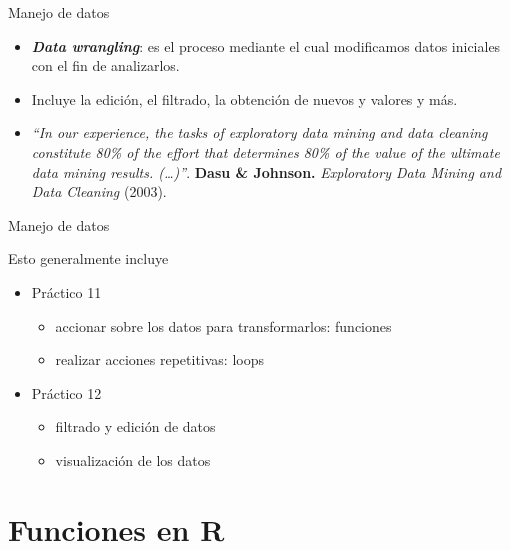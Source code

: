 \documentclass[ignorenonframetext,]{beamer}
\providecommand{\tightlist}{%
  \setlength{\itemsep}{0pt}\setlength{\parskip}{0pt}}
\begin{document}
\begin{frame}{Manejo de datos}
\protect\hypertarget{manejo-de-datos-2}{}

\begin{itemize}
\tightlist
\item
  \textbf{\emph{Data wrangling}}: es el proceso mediante el cual
  modificamos datos iniciales con el fin de analizarlos.
\item
  Incluye la edición, el filtrado, la obtención de nuevos y valores y
  más.
\item
  \emph{``In our experience, the tasks of exploratory data mining and
  data cleaning constitute 80\% of the effort that determines 80\% of
  the value of the ultimate data mining results. (\ldots{})''}.
  \textbf{Dasu \& Johnson.} \emph{Exploratory Data Mining and Data
  Cleaning} (2003).
\end{itemize}

\end{frame}

\begin{frame}{Manejo de datos}
\protect\hypertarget{manejo-de-datos-3}{}

Esto generalmente incluye

\begin{itemize}
\tightlist
\item
  Práctico 11

  \begin{itemize}
  \tightlist
  \item
    accionar sobre los datos para transformarlos: funciones
  \item
    realizar acciones repetitivas: loops
  \end{itemize}
\item
  Práctico 12

  \begin{itemize}
  \tightlist
  \item
    filtrado y edición de datos
  \item
    visualización de los datos
  \end{itemize}
\end{itemize}

\end{frame}

\hypertarget{funciones-en-r}{%
\section{Funciones en R}\label{funciones-en-r}}
\end{document}
